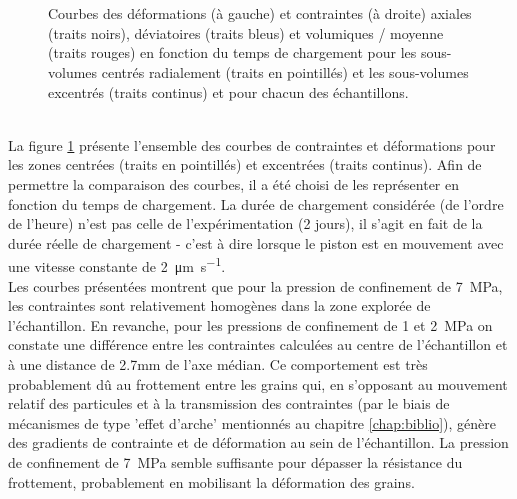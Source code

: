 	\begin{figure}\centering
		\\
		\\
		\caption{\label{fig06:contraintes_radial}Courbes des déformations (à gauche) et contraintes (à droite) axiales (traits noirs), déviatoires (traits bleus) et volumiques / moyenne (traits rouges) en fonction du temps de chargement pour les sous-volumes centrés radialement (traits en pointillés) et les sous-volumes excentrés (traits continus) et pour chacun des échantillons.}
	\end{figure}
	\\La figure \ref{fig06:contraintes_radial} présente l'ensemble des courbes de contraintes et déformations pour les zones centrées (traits en pointillés) et excentrées (traits continus). Afin de permettre la comparaison des courbes, il a été choisi de les représenter en fonction du temps de chargement. La durée de chargement considérée (de l'ordre de l'heure) n'est pas celle de l'expérimentation (\num{2} jours), il s'agit en fait de la durée réelle de chargement - c'est à dire lorsque le piston est en mouvement avec une vitesse constante de \SI[per-mode=symbol]{2}{\micro\meter\per\second}.
	\\Les courbes présentées montrent que pour la pression de confinement de \SI{7}{\mega\pascal}, les contraintes sont relativement homogènes dans la zone explorée de l'échantillon. En revanche, pour les pressions de confinement de \num{1} et \SI{2}{\mega\pascal} on constate une différence entre les contraintes calculées au centre de l'échantillon et à une distance de 2.7mm de l'axe médian. Ce comportement est très probablement dû au frottement entre les grains qui, en s'opposant au mouvement relatif des particules et à la transmission des contraintes (par le biais de mécanismes de type 'effet d'arche' mentionnés au chapitre \ref{chap:biblio}), génère des gradients de contrainte et de déformation au sein de l'échantillon. La pression de confinement de \SI{7}{\mega\pascal} semble suffisante pour dépasser la résistance du frottement, probablement en mobilisant la déformation des grains.
